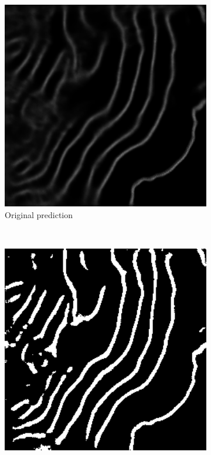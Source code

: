 \begin{figure}[t]
    \centering
    \begin{subfigure}[t]{0.32\textwidth}
        \centering
        \includegraphics[width=1\textwidth, valign=c]{images/skel-pred.png}
        \caption{Original prediction}
    \end{subfigure}
    ~
    \begin{subfigure}[t]{0.32\textwidth}
        \centering
        \includegraphics[width=1\textwidth, valign=c]{images/skel-thresh.png}

\end{subfigure}
\end{figure}
